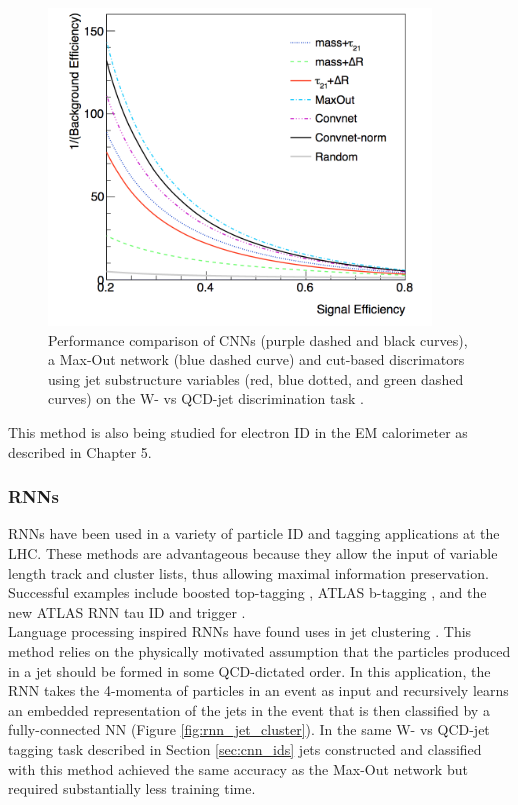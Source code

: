 \begin{figure}[htb!]
    \centering
    \includegraphics[width=4in]{figures/chapter4/wqcd_jetimages_results.png}
    \caption{Performance comparison of CNNs (purple dashed and black curves), a Max-Out network (blue dashed curve) and cut-based discrimators using jet substructure variables (red, blue dotted, and green dashed curves) on the W- vs QCD-jet discrimination task \cite{wqcd_jetimages}.}
    \label{fig:wqcd_jetimages}
\end{figure}

This method is also being studied for electron ID in the EM calorimeter as described in Chapter 5. 

\subsubsection{RNNs}
RNNs have been used in a variety of particle ID and tagging applications at the LHC. These methods are advantageous because they allow the input of variable length track and cluster lists, thus allowing maximal information preservation. Successful examples include boosted top-tagging \cite{top_rnn}, ATLAS b-tagging \cite{rnn_bottom}, and the new ATLAS RNN tau ID and trigger \cite{tau_rnn}.\\

Language processing inspired RNNs have found uses in jet clustering \cite{qcd_clustering}. This method relies on the physically motivated assumption that the particles produced in a jet should be formed in some QCD-dictated order. In this application, the RNN takes the 4-momenta of particles in an event as input and recursively learns an embedded representation of the jets in the event that is then classified by a fully-connected NN (Figure \ref{fig:rnn_jet_cluster}). In the same W- vs QCD-jet tagging task described in Section \ref{sec:cnn_ids} jets constructed and classified with this method achieved the same accuracy as the Max-Out network but required substantially less training time.

